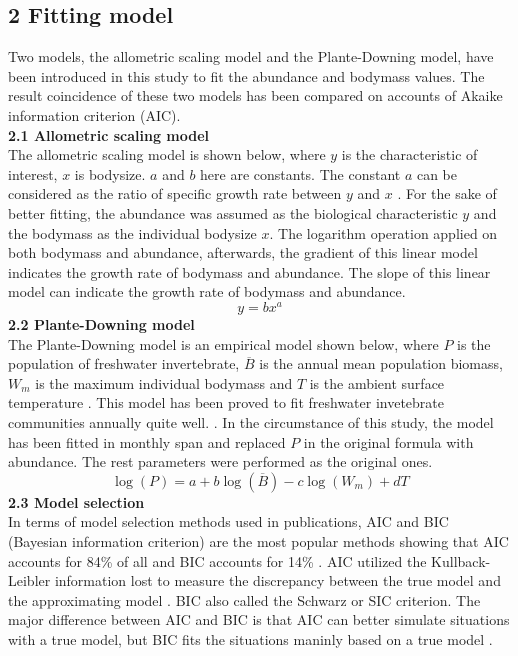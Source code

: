 \documentclass[11pt]{article}
\begin{document}
\begin{linenumbers}
\section*{2 Fitting model}
Two models, the allometric scaling model and the Plante-Downing model, have been introduced in this study to fit the abundance and bodymass values. The result coincidence of these two models has been compared on accounts of Akaike information criterion (AIC).    \\
\textbf{2.1 Allometric scaling model} \\
The allometric scaling model is shown below, where $y$ is the characteristic of interest, $x$ is bodysize. $a$ and $b$ here are constants.
The constant $a$ can be considered as the ratio of specific growth rate between $y$ and $x$ \cite{huxley1950relative}.
For the sake of better fitting, the abundance was assumed as the biological characteristic $y$ and the bodymass as the individual bodysize $x$.
The logarithm operation applied on both bodymass and abundance, afterwards, the gradient of this linear model indicates the growth rate of bodymass and abundance.
The slope of this linear model can indicate the growth rate of bodymass and abundance.
\begin{equation}
     y= b x^a
\end{equation}
\textbf{2.2 Plante-Downing model} \\
The Plante-Downing model is an empirical model shown below, where $P$ is the population of freshwater invertebrate, $\overline{B}$ is the annual mean population biomass, $\mathit{W}_{m}$ is the maximum individual bodymass and $T$ is the ambient surface temperature \cite{plante1989production}.
This model has been proved to fit freshwater invetebrate communities annually quite well.  \cite{plante1989production}.
In the circumstance of this study, the model has been fitted in monthly span and replaced $P$ in the original formula with abundance. The rest parameters were performed as the original ones.
\begin{equation}
     \log(P) = a +b \log(\overline{B}) - c \log(\mathit{W}_{m}) + d T
\end{equation}
\textbf{2.3 Model selection} \\
In terms of model selection methods used in publications, AIC and BIC (Bayesian information criterion) are the most popular methods showing that AIC accounts for 84\% of all and BIC accounts for 14\% \cite{aho2014model}. AIC utilized the Kullback-Leibler information lost to measure the discrepancy between the true model and the approximating model \cite{wagenmakers2004aic}. BIC also called the Schwarz or SIC criterion. The major difference between AIC and BIC is that AIC can better simulate situations with a true model, but BIC fits the situations maninly based on a true model \cite{aho2014model}. \\

\end{linenumbers}
\end{document}
